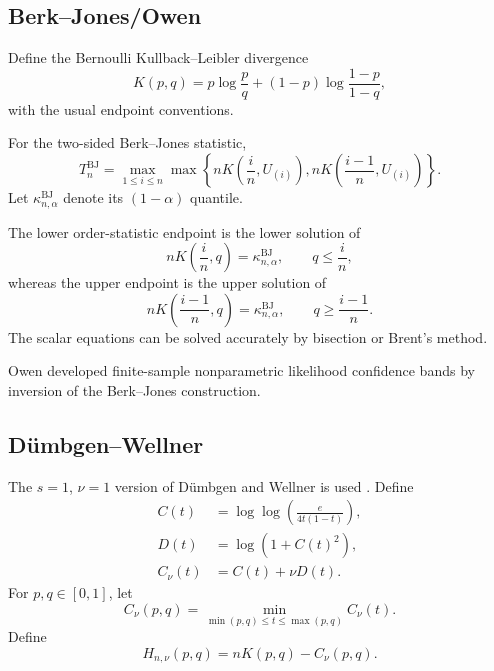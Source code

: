 \documentclass[11pt]{article}
\begin{document}
\subsection{Berk--Jones/Owen}

Define the Bernoulli Kullback--Leibler divergence
\begin{equation}
    K(p,q)
    =
    p\log\frac{p}{q}
    +
    (1-p)
    \log
    \frac{1-p}{1-q},
    \label{eq:KL}
\end{equation}
with the usual endpoint conventions.

For the two-sided Berk--Jones statistic,
\begin{equation}
    T_n^{\mathrm{BJ}}
    =
    \max_{1\leq i\leq n}
    \max
    \left\{
        nK\!\left(
            \frac{i}{n},U_{(i)}
        \right),
        nK\!\left(
            \frac{i-1}{n},U_{(i)}
        \right)
    \right\}.
    \label{eq:BJstat}
\end{equation}
Let $\kappa_{n,\alpha}^{\mathrm{BJ}}$ denote its
$(1-\alpha)$ quantile.

The lower order-statistic endpoint is the lower solution of
\begin{equation}
    nK\!\left(
        \frac{i}{n},q
    \right)
    =
    \kappa_{n,\alpha}^{\mathrm{BJ}},
    \qquad
    q\leq \frac{i}{n},
\end{equation}
whereas the upper endpoint is the upper solution of
\begin{equation}
    nK\!\left(
        \frac{i-1}{n},q
    \right)
    =
    \kappa_{n,\alpha}^{\mathrm{BJ}},
    \qquad
    q\geq \frac{i-1}{n}.
\end{equation}
The scalar equations can be solved accurately by bisection or Brent's
method.

Owen \cite{Owen1995} developed finite-sample nonparametric likelihood
confidence bands by inversion of the Berk--Jones construction.


\subsection{Dümbgen--Wellner}

The $s=1$, $\nu=1$ version of Dümbgen and Wellner is used
\cite{DumbgenWellner2023}.  Define
\begin{align}
    C(t)
    &=
    \log
    \log
    \left(
        \frac{e}{4t(1-t)}
    \right),
    \\
    D(t)
    &=
    \log
    \left(
        1+C(t)^2
    \right),
    \\
    C_\nu(t)
    &=
    C(t)+\nu D(t).
\end{align}
For $p,q\in[0,1]$, let
\begin{equation}
    C_\nu(p,q)
    =
    \min_{
        \min(p,q)\leq t\leq\max(p,q)
    }
    C_\nu(t).
\end{equation}
Define
\begin{equation}
    H_{n,\nu}(p,q)
    =
    nK(p,q)-C_\nu(p,q).
\end{equation}
\end{document}
